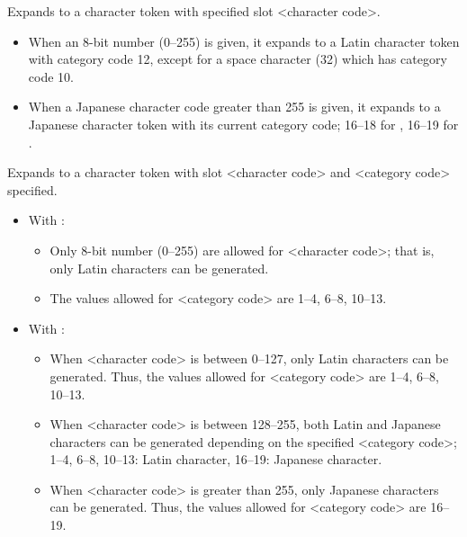 \documentclass[a4paper,11pt,dvipdfmx]{article}
\begin{document}
\begin{simplelist}
  Expands to a character token with specified slot <character code>.
  \begin{itemize}
   \item When an 8-bit number (0--255) is given,
     it expands to a Latin character token with category code 12,
     except for a space character (32) which has category code 10.
   \item When a Japanese character code greater than 255 is given,
     it expands to a Japanese character token with its current category code;
     16--18 for \epTeX, 16--19 for \eupTeX.
  \end{itemize}

  Expands to a character token with slot <character code> and
  <category code> specified.
  \begin{itemize}
   \item With \epTeX:
     \begin{itemize}
      \item Only 8-bit number (0--255) are allowed for <character code>;
        that is, only Latin characters can be generated.
      \item The values allowed for <category code> are 1--4, 6--8, 10--13.
     \end{itemize}
   \item With \eupTeX:
     \begin{itemize}
      \item When <character code> is between 0--127,
        only Latin characters can be generated.
        Thus, the values allowed for <category code> are
        1--4, 6--8, 10--13.
      \item When <character code> is between 128--255,
        both Latin and Japanese characters can be generated
        depending on the specified <category code>;
        1--4, 6--8, 10--13: Latin character,
        16--19: Japanese character.
      \item When <character code> is greater than 255,
        only Japanese characters can be generated.
        Thus, the values allowed for <category code> are
        16--19.
     \end{itemize}
  \end{itemize}
\end{simplelist}
\end{document}
